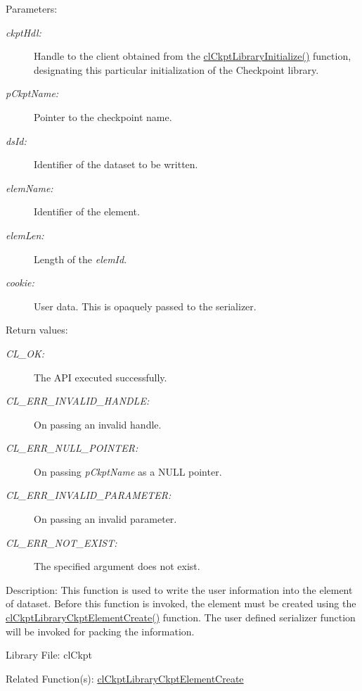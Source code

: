 \begin{Desc}
\item[Parameters:]
\begin{description}
\item[{\em ckpt\-Hdl:}]Handle to the client obtained from the \hyperlink{group__group10_ga2}{cl\-Ckpt\-Library\-Initialize()} function, designating this particular initialization of the Checkpoint library. \item[{\em p\-Ckpt\-Name:}]Pointer to the checkpoint name. \item[{\em ds\-Id:}]Identifier of the dataset to be written. \item[{\em elem\-Name:}]Identifier of the element. \item[{\em elem\-Len:}]Length of the {\em elem\-Id\/}. \item[{\em cookie:}]User data. This is opaquely passed to the serializer.\end{description}
\end{Desc}
\begin{Desc}
\item[Return values:]
\begin{description}
\item[{\em CL\_\-OK:}]The API executed successfully. \item[{\em CL\_\-ERR\_\-INVALID\_\-HANDLE:}]On passing an invalid handle. \item[{\em CL\_\-ERR\_\-NULL\_\-POINTER:}]On passing {\em p\-Ckpt\-Name\/} as a NULL pointer. \item[{\em CL\_\-ERR\_\-INVALID\_\-PARAMETER:}]On passing an invalid parameter. \item[{\em CL\_\-ERR\_\-NOT\_\-EXIST:}]The specified argument does not exist.\end{description}
\end{Desc}
\begin{Desc}
\item[Description:]This function is used to write the user information into the element of dataset. Before this function is invoked, the element must be created using the \hyperlink{group__group10_ga12}{cl\-Ckpt\-Library\-Ckpt\-Element\-Create()} function. The user defined serializer function will be invoked for packing the information.\end{Desc}
\begin{Desc}
\item[Library File:]cl\-Ckpt\end{Desc}
\begin{Desc}
\item[Related Function(s):]\hyperlink{group__group10}{cl\-Ckpt\-Library\-Ckpt\-Element\-Create} \end{Desc}


